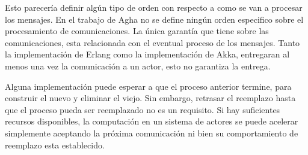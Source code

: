 
Esto parecería definir algún tipo de orden con respecto a como se van a procesar los mensajes. En el trabajo de Agha\cite{Agha:1986:AMC:7929} no se define ningún orden especifico sobre el procesamiento de comunicaciones. La única garantía que tiene sobre las comunicaciones, esta relacionada con el eventual proceso de los mensajes. Tanto la implementación de Erlang\cite{Cesarini:2009:EP:1717841} como la implementación de Akka\cite{Wyatt:2013:AC:2663429}, entregaran al menos una vez la comunicación a un actor, esto no garantiza la entrega.

Alguna implementación puede esperar a que el proceso anterior termine, para construir el nuevo y eliminar el viejo. Sin embargo, retrasar el reemplazo hasta que el proceso pueda ser reemplazado no es un requisito. Si hay suficientes recursos disponibles, la computación en un sistema de actores se puede acelerar simplemente aceptando la próxima comunicación ni bien su comportamiento de reemplazo esta establecido.

